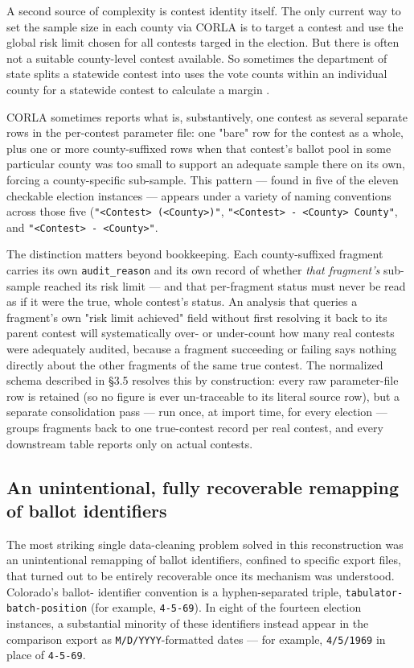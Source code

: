 A second source of complexity is contest identity itself.
The only current way to set the sample size in each county via CORLA
is to target a contest and use the global risk limit chosen for all contests
targed in the election. But there is often not a suitable county-level contest
available. So sometimes the department of state splits a statewide contest
into uses the vote counts
within an individual county for a statewide contest to calculate a margin
.

CORLA sometimes reports what is, substantively, one contest as several
separate rows in the per-contest parameter file: one "bare" row for the
contest as a whole, plus one or more county-suffixed rows when that
contest's ballot pool in some particular county was too small to support an
adequate sample there on its own, forcing a county-specific sub-sample.
This pattern — found in five of the eleven checkable election instances —
appears under a variety of naming conventions across those five
(\texttt{"<Contest> (<County>)"}, \texttt{"<Contest> - <County> County"}, and
\texttt{"<Contest> - <County>"}.

The distinction matters beyond bookkeeping. Each county-suffixed fragment
carries its own \texttt{audit\_reason} and its own record of whether \textit{that
fragment's} sub-sample reached its risk limit — and that per-fragment
status must never be read as if it were the true, whole contest's status.
An analysis that queries a fragment's own "risk limit achieved" field
without first resolving it back to its parent contest will systematically
over- or under-count how many real contests were adequately audited,
because a fragment succeeding or failing says nothing directly about the
other fragments of the same true contest. The normalized schema described
in §3.5 resolves this by construction: every raw parameter-file row is
retained (so no figure is ever un-traceable to its literal source row), but
a separate consolidation pass — run once, at import time, for every
election — groups fragments back to one true-contest record per real
contest, and every downstream table reports only on actual contests.

\subsection{An unintentional, fully recoverable remapping of ballot identifiers}

The most striking single data-cleaning problem solved in this
reconstruction was an unintentional remapping of ballot identifiers,
confined to specific export files, that turned out to be entirely
recoverable once its mechanism was understood. Colorado's ballot-
identifier convention is a hyphen-separated triple,
\texttt{{tabulator}-{batch}-{position}} (for example, \texttt{4-5-69}). In eight of the
fourteen election instances, a substantial minority of these identifiers
instead appear in the comparison export as \texttt{M/D/YYYY}-formatted dates —
for example, \texttt{4/5/1969} in place of \texttt{4-5-69}.

